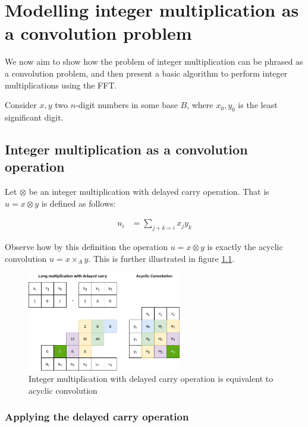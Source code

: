 \chapter{Modelling integer multiplication as a convolution problem}
\label{chapter:integer_multiplication_convolution}

We now aim to show how the problem of integer multiplication can be phrased as
a convolution problem, and then present a basic algorithm to perform integer
multiplications using the FFT.

Consider $x, y$ two $n$-digit numbers in some base $B$, where $x_0, y_0$ is the
least significant digit.

\section{Integer multiplication as a convolution operation}

Let $\otimes$ be an integer multiplication with delayed carry operation. That
is $u = x \otimes y$ is defined as follows:

\begin{align*}
		u_i & = \sum_{j + k = i} x_j y_k
\end{align*}

Observe how by this definition the operation $u = x \otimes y$ is exactly the
acyclic convolution $u = x \times_A y$. This is further illustrated in figure
\ref{fig:multiplication_convolution}.

\begin{figure}
		\centering
		\includegraphics[width=0.6\textwidth]{../resources/multiplication_convolution.drawio.png}
		\caption{Integer multiplication with delayed carry operation is equivalent to acyclic convolution}
		\label{fig:multiplication_convolution}
\end{figure}

\subsection{Applying the delayed carry operation}

